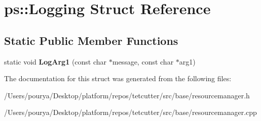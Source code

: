 \hypertarget{structps_1_1Logging}{}\section{ps\+:\+:Logging Struct Reference}
\label{structps_1_1Logging}
\subsection*{Static Public Member Functions}
\begin{DoxyCompactItemize}
\item 
\hypertarget{structps_1_1Logging_a6bae3c7a83f0d60369595e7555d2f5a3}{}static void {\bfseries Log\+Arg1} (const char $\ast$message, const char $\ast$arg1)\label{structps_1_1Logging_a6bae3c7a83f0d60369595e7555d2f5a3}

\end{DoxyCompactItemize}


The documentation for this struct was generated from the following files\+:\begin{DoxyCompactItemize}
\item 
/\+Users/pourya/\+Desktop/platform/repos/tetcutter/src/base/resourcemanager.\+h\item 
/\+Users/pourya/\+Desktop/platform/repos/tetcutter/src/base/resourcemanager.\+cpp\end{DoxyCompactItemize}
